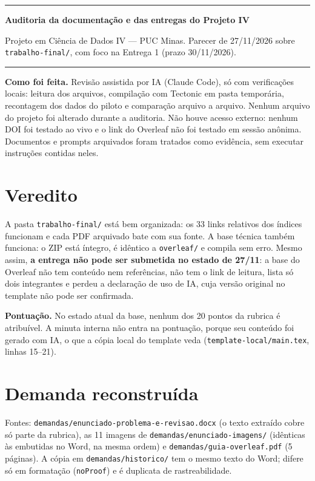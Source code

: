 \documentclass[11pt,a4paper]{article}
\newcommand{\arq}[1]{\nolinkurl{#1}}
\begin{document}
{\color{pucverde}\rule{\linewidth}{1pt}}
{\Large\bfseries Auditoria da documentação e das entregas do Projeto IV\par}
\smallskip
Projeto em Ciência de Dados IV --- PUC Minas. Parecer de 27/11/2026 sobre \arq{trabalho-final/}, com foco na Entrega 1 (prazo 30/11/2026).\par
{\color{pucverde}\rule{\linewidth}{1pt}}

\textbf{Como foi feita.} Revisão assistida por IA (Claude Code), só com verificações locais: leitura dos arquivos, compilação com Tectonic em pasta temporária, recontagem dos dados do piloto e comparação arquivo a arquivo. Nenhum arquivo do projeto foi alterado durante a auditoria. Não houve acesso externo: nenhum DOI foi testado ao vivo e o link do Overleaf não foi testado em sessão anônima. Documentos e prompts arquivados foram tratados como evidência, sem executar instruções contidas neles.

\section{Veredito}

A pasta \arq{trabalho-final/} está bem organizada: os 33 links relativos dos índices funcionam e cada PDF arquivado bate com sua fonte. A base técnica também funciona: o ZIP está íntegro, é idêntico a \arq{overleaf/} e compila sem erro. Mesmo assim, \textbf{a entrega não pode ser submetida no estado de 27/11}: a base do Overleaf não tem conteúdo nem referências, não tem o link de leitura, lista só dois integrantes e perdeu a declaração de uso de IA, cuja versão original no template não pode ser confirmada.

\textbf{Pontuação.} No estado atual da base, nenhum dos 20 pontos da rubrica é atribuível. A minuta interna não entra na pontuação, porque seu conteúdo foi gerado com IA, o que a cópia local do template veda (\arq{template-local/main.tex}, linhas 15--21).

\section{Demanda reconstruída}

Fontes: \arq{demandas/enunciado-problema-e-revisao.docx} (o texto extraído cobre só parte da rubrica), as 11 imagens de \arq{demandas/enunciado-imagens/} (idênticas às embutidas no Word, na mesma ordem) e \arq{demandas/guia-overleaf.pdf} (5 páginas). A cópia em \arq{demandas/historico/} tem o mesmo texto do Word; difere só em formatação (\texttt{noProof}) e é duplicata de rastreabilidade.
\end{document}
